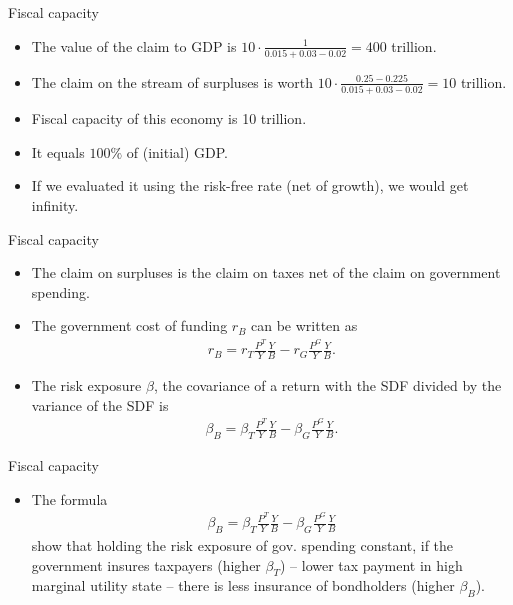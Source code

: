 \documentclass[11pt,xcolor={dvipsnames},aspectratio=159,hyperref={pdftex,pdfpagemode=UseNone,hidelinks,pdfdisplaydoctitle=true},usepdftitle=false]{beamer}
\begin{document}
\begin{frame}{Fiscal capacity}  
    \begin{itemize}
        \item The value of the claim to GDP is $10\cdot \frac{1}{0.015+0.03-0.02} = 400$ trillion.
        \item The claim on the stream of surpluses is worth $10\cdot \frac{0.25-0.225}{0.015+0.03-0.02} = 10$ trillion.
        \item Fiscal capacity of this economy is 10 trillion. 
        \item It equals $100\%$ of (initial) GDP.
        \item If we evaluated it using the risk-free rate (net of growth), we would get infinity.
    \end{itemize}
\end{frame}


\begin{frame}{Fiscal capacity}  
    \begin{itemize}
        \item The claim on surpluses is the claim on taxes net of the claim on government spending.
        \item The government cost of funding $r_B$ can be written as \begin{align*}
            r_B = r_T \frac{P^T}{Y}\frac{Y}{B} - r_G \frac{P^G}{Y}\frac{Y}{B}.
        \end{align*}
        \item The risk exposure $\beta$, the covariance of a return with the SDF divided by the variance of the SDF is \begin{align*}
            \beta_B = \beta_T \frac{P^T}{Y}\frac{Y}{B} - \beta_G \frac{P^G}{Y}\frac{Y}{B}. 
        \end{align*}
    \end{itemize}

\end{frame}

\begin{frame}{Fiscal capacity}  
    \begin{itemize}
        \item The formula \begin{align*}
            \beta_B = \beta_T \frac{P^T}{Y}\frac{Y}{B} - \beta_G \frac{P^G}{Y}\frac{Y}{B}
        \end{align*}
        show that holding the risk exposure of gov. spending constant, if the government insures taxpayers (higher
        $\beta_T$) --  lower tax payment in high marginal utility state -- there is less insurance
        of bondholders (higher $\beta_B$).
    \end{itemize}
\end{frame}
\end{document}
